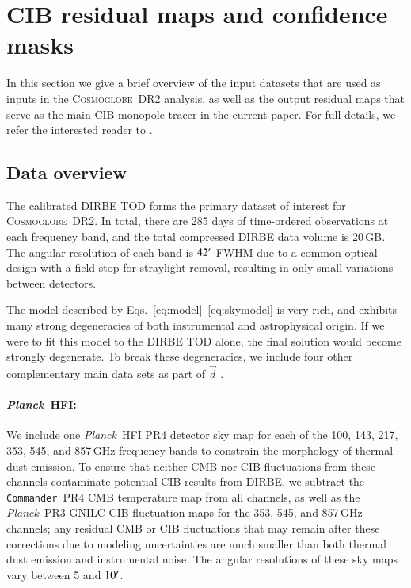 \documentclass{aa}
\def\commander{\texttt{Commander}}
\def\Planck{\textit{Planck}}
\newcommand{\dv}[0]{\vec{d}}
\newcommand{\cosmoglobe}{\textsc{Cosmoglobe}}
\begin{document}
\section{CIB residual maps and confidence masks}
\label{sec:data}

In this section we give a brief overview of the input datasets that
are used as inputs in the \cosmoglobe\ DR2 analysis, as well as the
output residual maps that serve as the main CIB monopole tracer in the
current paper. For full details, we refer the interested reader to
\citet{CG02_01}. 

\subsection{Data overview}
\label{sec:datasummary}

The calibrated DIRBE TOD forms the primary dataset of interest for
\cosmoglobe\ DR2. In total, there are 285 days of time-ordered
observations at each frequency band, and the total compressed DIRBE
data volume is 20\,GB. The angular resolution of each band is
$42\arcm$ FWHM due to a common optical design with a field stop for straylight removal, resulting in  only small variations between detectors.

The model described by
Eqs.~\eqref{eq:model}--\eqref{eq:skymodel} is very rich, and exhibits
many strong degeneracies of both instrumental and astrophysical
origin. If we were to fit this model to the DIRBE TOD alone, the final
solution would become strongly degenerate. To break these
degeneracies, we include four other complementary main data sets as
part of $\dv$ \citep{CG02_01}.


\paragraph{\Planck\ HFI:} We include one \Planck\ HFI PR4 \citep{npipe} detector sky map for each of the 100, 143, 217,
  353, 545, and 857\,GHz frequency bands to constrain the morphology
  of thermal dust emission. To ensure that neither CMB nor CIB
  fluctuations from these channels contaminate potential CIB results
  from DIRBE, we subtract the \commander\ PR4 CMB temperature map
  from all channels, as well as the \Planck\ PR3 GNILC
  CIB fluctuation maps \citep{gnilc_cib} for the 353, 545, and 857\,GHz channels; any
  residual CMB or CIB fluctuations that may remain after these
  corrections due to modeling uncertainties are much smaller than
  both thermal dust emission and instrumental noise. The angular
  resolutions of these sky maps vary between 5 and $10\arcm$.
\end{document}
